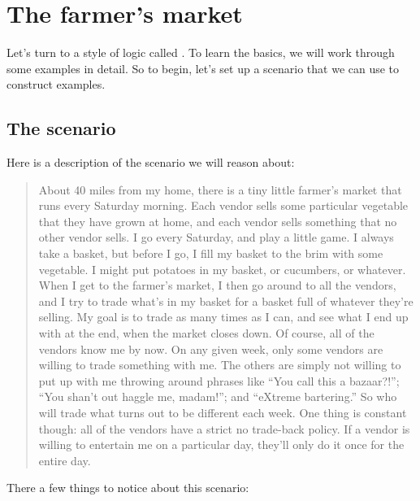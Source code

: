 \documentclass[../../../main.tex]{subfiles}
\begin{document}
\chapter{The farmer's market}


Let's turn to a style of logic called . To learn the basics, we will work through some examples in detail. So to begin, let's set up a scenario that we can use to construct examples.


\section{The scenario}

Here is a description of the scenario we will reason about:

\begin{quote}
  About 40 miles from my home, there is a tiny little farmer's market that runs every Saturday morning. Each vendor sells some particular vegetable that they have grown at home, and each vendor sells something that no other vendor sells. I go every Saturday, and play a little game. I always take a basket, but before I go, I fill my basket to the brim with some vegetable. I might put potatoes in my basket, or cucumbers, or whatever. When I get to the farmer's market, I then go around to all the vendors, and I try to trade what's in my basket for a basket full of whatever they're selling. My goal is to trade as many times as I can, and see what I end up with at the end, when the market closes down. Of course, all of the vendors know me by now. On any given week, only some vendors are willing to trade something with me. The others are simply not willing to put up with me throwing around phrases like ``You call this a bazaar?!''; ``You shan't out haggle me, madam!''; and ``eXtreme bartering.'' So who will trade what turns out to be different each week. One thing is constant though: all of the vendors have a strict no trade-back policy. If a vendor is willing to entertain me on a particular day, they'll only do it once for the entire day.
\end{quote}

\noindent
There a few things to notice about this scenario:
\end{document}
